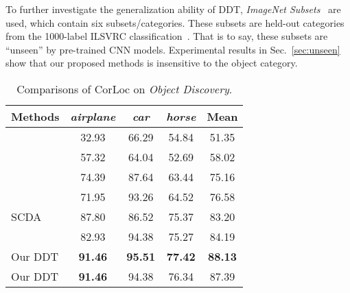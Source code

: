 \documentclass[twocolumn]{svjour3}          \smartqed  \usepackage{graphicx}
\begin{document}
To further investigate the generalization ability of DDT, \emph{ImageNet Subsets}~\citep{yaoeccv2016} are used, which contain six subsets/categories. These subsets are held-out categories from the 1000-label ILSVRC classification~\citep{russaijcv2015}. That is to say, these subsets are ``unseen'' by pre-trained CNN models. Experimental results in Sec.~\ref{sec:unseen} show that our proposed methods is insensitive to the object category.

\begin{table}[t!]
 \caption{Comparisons of CorLoc on \emph{Object Discovery}.} \label{table:objdisc}
 \centering
\setlength{\tabcolsep}{3pt}
 \begin{tabular}{l||c|c|c||c}
  \hline
  {Methods}  & {\emph{airplane}} & {\emph{car}} & {\emph{horse}} & {\textbf{Mean}} \\  
  \hline
  \citet{joulincoscvpr2010}  & 32.93  & 66.29 &  54.84 &  51.35 \\
  \citet{joulinmccvpr2010}  & 57.32  & 64.04 &  52.69  & 58.02\\
  \citet{rubinscvpr2013}  & 74.39  & 87.64  & 63.44 &  75.16\\
  \citet{tangcvpr2014}  & 71.95 &  93.26  & 64.52  & 76.58\\
  SCDA & 87.80  &  	86.52  &  	75.37  &  	83.20 \\
  \citet{chicvpr2015}  & 82.93  & 94.38  & 75.27 &  84.19\\
  \hline
  Our DDT & \textbf{91.46}	 & \textbf{95.51}	 & \textbf{77.42}	 & \textbf{88.13}\\
  Our DDT & \textbf{91.46}	 & {94.38}	 & {76.34}	 & {87.39}\\
  \hline
 \end{tabular}
\end{table}
\end{document}
